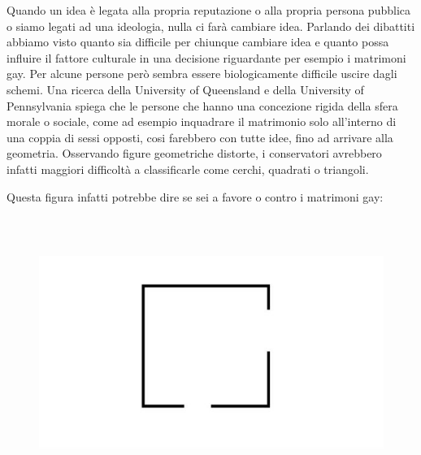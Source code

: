 \documentclass[12pt]{book} %
\begin{document}
Quando un idea è legata alla propria reputazione o alla propria persona pubblica o siamo legati ad una ideologia, nulla ci farà cambiare idea. 
Parlando dei dibattiti abbiamo visto quanto sia difficile per chiunque cambiare idea e quanto possa influire il fattore
culturale in una decisione riguardante per esempio i matrimoni gay. Per alcune persone però sembra essere
biologicamente difficile uscire dagli schemi. Una ricerca della University of Queensland e della University of
Pennsylvania spiega
che le persone che hanno una concezione rigida della sfera morale o sociale, come ad esempio inquadrare il matrimonio
solo all'interno di una coppia di sessi opposti, cosi farebbero con tutte idee, fino ad arrivare alla geometria.
Osservando figure geometriche distorte, i conservatori avrebbero infatti maggiori difficoltà a classificarle come
cerchi, quadrati o triangoli.

Questa figura infatti potrebbe dire se sei a favore o contro i matrimoni gay:

\needspace{4cm}
\begin{figure}[H]
\includegraphics[width=15.875cm,height=8.864cm]{images/Libro-img031.png}\end{figure}

\bigskip
\end{document}
